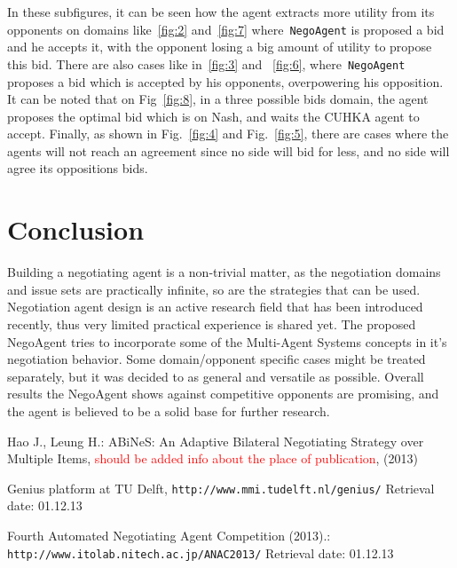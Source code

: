 \documentclass[html]{report}    %
\begin{document}
In these subfigures, it can be seen how the agent extracts more utility from its opponents on domains like~\ref{fig:2} and~\ref{fig:7} where~\texttt{NegoAgent} is proposed a bid and he accepts it, with the opponent losing a big amount of utility to propose this bid. There are also cases like in~\ref{fig:3} and ~\ref{fig:6}, where~\texttt{NegoAgent} proposes a bid which is accepted by his opponents, overpowering his opposition. It can be noted that on Fig~\ref{fig:8}, in a three possible bids domain, the agent proposes the optimal bid which is on Nash, and waits the CUHKA agent to accept. Finally, as shown in Fig.~\ref{fig:4} and Fig.~\ref{fig:5}, there are cases where the agents will not reach an agreement since no side will bid for less, and no side will agree its oppositions bids.


\section{Conclusion}
Building a negotiating agent is a non-trivial matter, as the negotiation domains and issue sets are practically infinite, so are the strategies that can be used. Negotiation agent design is an active research field that has been introduced recently, thus very limited practical experience is shared yet. The proposed NegoAgent tries to incorporate some of the Multi-Agent Systems concepts in it's negotiation behavior. Some domain/opponent specific cases might be treated separately, but it was decided to as general and versatile as possible. Overall results the NegoAgent shows against competitive opponents are promising, and the agent is believed to be a solid base for further research. 

\begin{thebibliography}{}

Hao J., Leung H.:
ABiNeS: An Adaptive Bilateral Negotiating Strategy over Multiple Items,
\textcolor{red}{should be added info about the place of publication}, (2013)

Genius platform at TU Delft,
\texttt{http://www.mmi.tudelft.nl/genius/} Retrieval date: 01.12.13

Fourth Automated Negotiating Agent Competition (2013).:
\texttt{http://www.itolab.nitech.ac.jp/ANAC2013/} Retrieval date: 01.12.13

\end{thebibliography}
\end{document}
